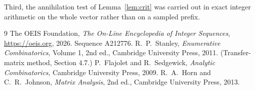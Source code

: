\documentclass[11pt,a4paper]{article}
\theoremstyle{plain}
\theoremstyle{definition}
\begin{document}
Third, the annihilation test of Lemma~\ref{lem:crit} was carried out in exact integer
arithmetic on the whole vector rather than on a sampled prefix.

\begin{thebibliography}{9}
 The OEIS Foundation, \emph{The On-Line Encyclopedia of Integer
Sequences}, \url{https://oeis.org}, 2026. Sequence A212776.
 R.~P.~Stanley, \emph{Enumerative Combinatorics}, Volume 1, 2nd ed.,
Cambridge University Press, 2011. (Transfer-matrix method, Section 4.7.)
 P.~Flajolet and R.~Sedgewick, \emph{Analytic Combinatorics}, Cambridge
University Press, 2009.
 R.~A.~Horn and C.~R.~Johnson, \emph{Matrix Analysis}, 2nd ed., Cambridge
University Press, 2013.
\end{thebibliography}
\end{document}
